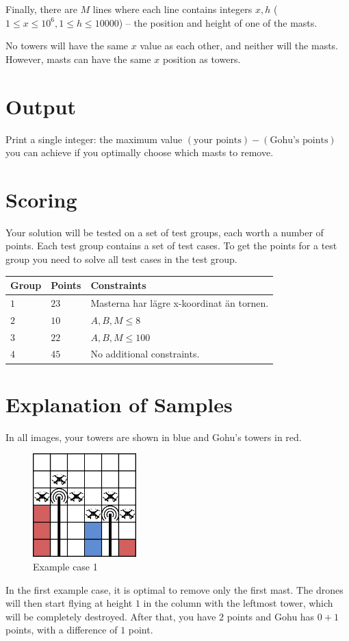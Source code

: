 Finally, there are $M$ lines where each line contains integers $x, h$ ($1 \leq x \leq 10^6, 1 \leq h \leq 10000$) -- the position and height of one of the masts.

No towers will have the same $x$ value as each other, and neither will the masts.
However, masts can have the same $x$ position as towers.

\section*{Output}
Print a single integer: the maximum value $(\text{your points}) - (\text{Gohu's points})$ you can achieve if you optimally choose which masts to remove.

\section*{Scoring}
Your solution will be tested on a set of test groups, each worth a number of points. Each test group contains
a set of test cases. To get the points for a test group you need to solve all test cases in the test group.

\noindent
\begin{tabular}{| l | l | l |}
  \hline
  \textbf{Group} & \textbf{Points} & \textbf{Constraints} \\ \hline
  $1$   & $23$       & Masterna har lägre x-koordinat än tornen. \\ \hline
  $2$   & $10$       & $A,B,M \leq 8$\\ \hline
  $3$   & $22$       & $A,B,M \leq 100$  \\ \hline
  $4$   & $45$       & No additional constraints. \\ \hline
\end{tabular}

\section*{Explanation of Samples}
In all images, your towers are shown in blue and Gohu's towers in red.

\begin{figure}[!h]
  \centering
  \includegraphics[width=4cm]{sample1.png}
  \caption{Example case 1}
\end{figure}
In the first example case, it is optimal to remove only the first mast.
The drones will then start flying at height $1$ in the column with the leftmost tower, which will be completely destroyed.
After that, you have $2$ points and Gohu has $0 + 1$ points, with a difference of $1$ point.

